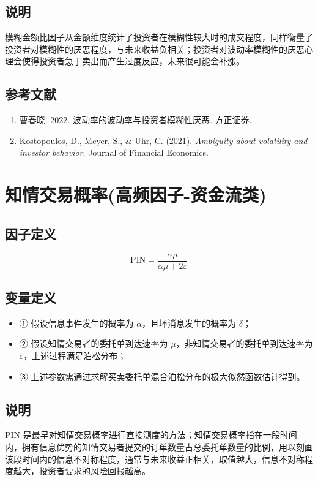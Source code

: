 \documentclass{article}
\begin{document}
\subsection{说明}
模糊金额比因子从金额维度统计了投资者在模糊性较大时的成交程度，同样衡量了投资者对模糊性的厌恶程度，与未来收益负相关；投资者对波动率模糊性的厌恶心理会使得投资者急于卖出而产生过度反应，未来很可能会补涨。

\subsection{参考文献}
\begin{enumerate}
    \item 曹春晓. 2022. 波动率的波动率与投资者模糊性厌恶. 方正证券.
    \item Kostopoulos, D., Meyer, S., \& Uhr, C. (2021). \textit{Ambiguity about volatility and investor behavior}. Journal of Financial Economics.
\end{enumerate}

\section{知情交易概率(高频因子-资金流类)}

\subsection{因子定义}
\begin{equation}
    \mathrm{PIN} = \frac{\alpha \mu}{\alpha \mu + 2\varepsilon}
\end{equation}

\subsection{变量定义}
\begin{itemize}
    \item ① 假设信息事件发生的概率为 \( \alpha \)，且坏消息发生的概率为 \( \delta \)；
    \item ② 假设知情交易者的委托单到达速率为 \( \mu \)，非知情交易者的委托单到达速率为 \( \varepsilon \)，上述过程满足泊松分布；
    \item ③ 上述参数需通过求解买卖委托单混合泊松分布的极大似然函数估计得到。
\end{itemize}

\subsection{说明}
PIN 是最早对知情交易概率进行直接测度的方法；知情交易概率指在一段时间内，拥有信息优势的知情交易者提交的订单数量占总委托单数量的比例，用以刻画该段时间内的信息不对称程度，通常与未来收益正相关，取值越大，信息不对称程度越大，投资者要求的风险回报越高。
\end{document}
